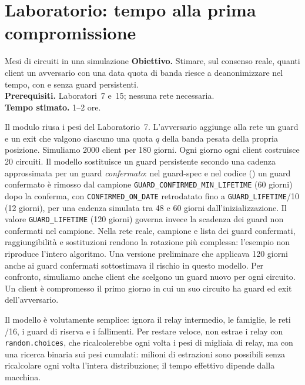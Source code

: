 \section{Laboratorio: tempo alla prima compromissione}\label{sec:lab-ricerca}

\begin{laboratorio}[19]{Mesi di circuiti in una simulazione}
\textbf{Obiettivo.} Stimare, sul consenso reale, quanti client un avversario con una data quota di banda riesce a deanonimizzare nel tempo, con e senza guard persistenti.\\
\textbf{Prerequisiti.} Laboratori~7 e~15; nessuna rete necessaria.\\
\textbf{Tempo stimato.} 1--2 ore.
\end{laboratorio}

Il modulo  riusa i pesi del Laboratorio~7. L'avversario aggiunge alla rete un guard e un exit che valgono ciascuno una quota $q$ della banda pesata della propria posizione. Simuliamo 2000 client per 180 giorni. Ogni giorno ogni client costruisce 20 circuiti. Il modello sostituisce un guard persistente secondo una cadenza approssimata per un guard \emph{confermato}:  nel guard-spec e nel codice () un guard confermato è rimosso dal campione \texttt{GUARD\_CONFIRMED\_MIN\_LIFETIME} (60 giorni) dopo la conferma, con \texttt{CONFIRMED\_ON\_DATE} retrodatato fino a \texttt{GUARD\_LIFETIME}/10 (12 giorni), per una cadenza simulata tra 48 e 60 giorni dall'inizializzazione. Il valore \texttt{GUARD\_LIFETIME} (120 giorni) governa invece la scadenza dei guard non confermati nel campione. Nella rete reale, campione e lista dei guard confermati, raggiungibilità e sostituzioni rendono la rotazione più complessa: l'esempio non riproduce l'intero algoritmo. Una versione preliminare che applicava 120 giorni anche ai guard confermati sottostimava il rischio in questo modello. Per confronto, simuliamo anche client che scelgono un guard nuovo per ogni circuito. Un client è compromesso il primo giorno in cui un suo circuito ha guard ed exit dell'avversario.

Il modello è volutamente semplice: ignora il relay intermedio, le famiglie, le reti /16, i guard di riserva e i fallimenti. Per restare veloce, non estrae i relay con \texttt{random.choices}, che ricalcolerebbe ogni volta i pesi di migliaia di relay, ma con una ricerca binaria sui pesi cumulati: milioni di estrazioni sono possibili senza ricalcolare ogni volta l'intera distribuzione; il tempo effettivo dipende dalla macchina.

